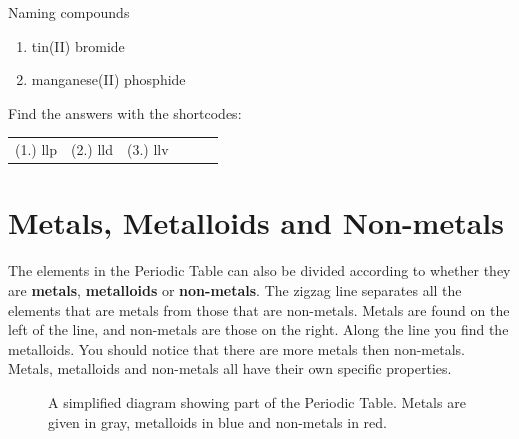 \begin{exercises}{Naming compounds}
{\begin{enumerate}[noitemsep, label=\textbf{\arabic*}. ]
\begin{enumerate}[noitemsep, label=\textbf{\alph*}. ]
\item tin(II) bromide
\item manganese(II) phosphide
\end{enumerate}
\end{enumerate}
    \label{m38708*cid5}
\par {} Find the answers with the shortcodes:
 \par \begin{tabular}[h]{cccccc}
 (1.) llp  &  (2.) lld  &  (3.) llv   & & \end{tabular}}
\end{exercises}
            \section{Metals, Metalloids and Non-metals}
            \nopagebreak
      \label{m38708*id65693}The elements in the Periodic Table can also be divided according to whether they are \textbf{metals}, \textbf{metalloids} or \textbf{non-metals}. The zigzag line separates all the elements that are metals from those that are non-metals. Metals are found on the left of the line, and non-metals are those on the right. Along the line you find the metalloids. You should notice that there are more metals then non-metals. Metals, metalloids and non-metals all have their own specific properties.\par 
\begin{figure}[h]

\begin{center}
\end{center}
\caption{A simplified diagram showing part of the Periodic Table. Metals are given in gray, metalloids in blue and non-metals in red.}
\label{fig:periodic}
\end{figure}
      \label{m38708*uid76}
